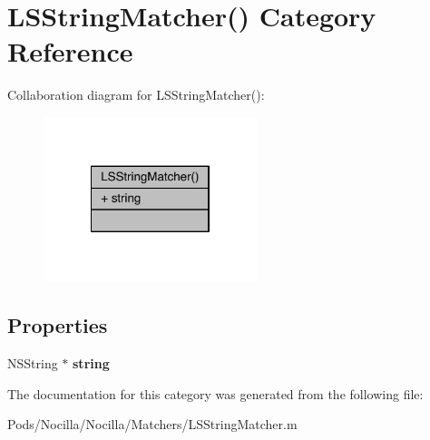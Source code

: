 \hypertarget{category_l_s_string_matcher_07_08}{\section{L\-S\-String\-Matcher() Category Reference}
\label{category_l_s_string_matcher_07_08}
}


Collaboration diagram for L\-S\-String\-Matcher()\-:\nopagebreak
\begin{figure}[H]
\begin{center}
\leavevmode
\includegraphics[width=176pt]{category_l_s_string_matcher_07_08__coll__graph}
\end{center}
\end{figure}
\subsection*{Properties}
\begin{DoxyCompactItemize}
\item 
\hypertarget{category_l_s_string_matcher_07_08_a70c8b550db4b1540e8011426fdcfba1a}{N\-S\-String $\ast$ {\bfseries string}}\label{category_l_s_string_matcher_07_08_a70c8b550db4b1540e8011426fdcfba1a}

\end{DoxyCompactItemize}


The documentation for this category was generated from the following file\-:\begin{DoxyCompactItemize}
\item 
Pods/\-Nocilla/\-Nocilla/\-Matchers/L\-S\-String\-Matcher.\-m\end{DoxyCompactItemize}
